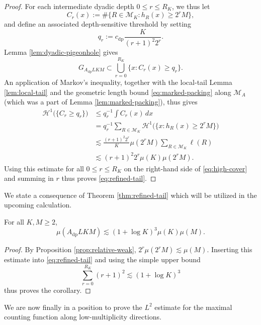 \documentclass[12pt]{amsart}
\numberwithin{equation}{section}
\newcommand{\cH}{\mathcal{H}}
\begin{document}
\begin{proof}
For each intermediate dyadic depth $0\leq r\leq R_K$, we thus let
$$
C_r(x):=\#\{R\in\mathscr M_K:h_R(x)\geq2^rM\},
$$
and define an associated depth-sensitive threshold by setting
$$
q_r:=c_{\mathrm{dp}}\frac{K}{(r+1)^2 2^r}.
$$
Lemma \ref{lem:dyadic-pigeonhole} gives
\begin{equation}\label{eq:high-cover}
 G_{A_{\mathrm{dp}}LKM}
 \subset\bigcup_{r=0}^{R_K}\{x:C_r(x)\geq q_r\}.
\end{equation}
An application of Markov's inequality, together with the local-tail Lemma \ref{lem:local-tail} and the geometric length bound \eqref{eq:marked-packing} along $\mathscr{M}_A$ (which was a part of Lemma \ref{lem:marked-packing}), thus gives
\begin{align*}
 \cH^1 \big(\big\{C_r\geq q_r\big\}\big)
 &\leq q_r^{-1}\int C_r(x)\,dx\\
 &=q_r^{-1}\sum_{R\in\mathscr M_K}
   \cH^1 \big(\{x:h_R(x)\geq2^rM\} \big)\\
 &\lesssim\frac{(r+1)^2 2^r}{K}\mu(2^rM)
   \sum_{R\in\mathscr M_K}\ell(R)\\
 &\lesssim(r+1)^2 2^r\mu(K)\mu(2^rM).
\end{align*}
Using this estimate for all $0 \leq r \leq R_K$ on the right-hand side of \eqref{eq:high-cover} and summing in $r$ thus proves \eqref{eq:refined-tail}.
\end{proof}

We state a consequence of Theorem \ref{thm:refined-tail} which will be utilized in the upcoming calculation.

\begin{corollary}\label{cor:polylog-tail}
For all $K,M\geq2$,
\begin{equation}\label{eq:polylog-tail}
 \mu(A_{\mathrm{dp}}LKM)
 \lesssim(1+\log K)^3\mu(K)\mu(M).
\end{equation}
\end{corollary}

\begin{proof}
By Proposition \ref{prop:relative-weak},
$
 2^r\mu(2^rM)\lesssim\mu(M).
$
Inserting this estimate into \eqref{eq:refined-tail} and using the simple upper bound
$$
 \sum_{r=0}^{R_K}(r+1)^2\lesssim(1+\log K)^3
$$
thus proves the corollary.
\end{proof}

We are now finally in a position to prove the $L^2$ estimate for the maximal counting function along low-multiplicity directions.
\end{document}
